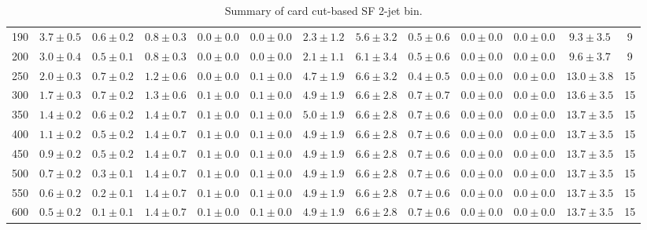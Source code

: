 \begin{table}
{\begin{center}
\begin{tabular}{l | c c | c c c c c c c c  | c c}
190 & $3.7\pm0.5$ & $0.6\pm0.2$ & $0.8\pm0.3$ & $0.0\pm0.0$ & $0.0\pm0.0$ & $2.3\pm1.2$ & $5.6\pm3.2$ & $0.5\pm0.6$ & $0.0\pm0.0$ & $0.0\pm0.0$ & $9.3\pm3.5$ & 9 \\
200 & $3.0\pm0.4$ & $0.5\pm0.1$ & $0.8\pm0.3$ & $0.0\pm0.0$ & $0.0\pm0.0$ & $2.1\pm1.1$ & $6.1\pm3.4$ & $0.5\pm0.6$ & $0.0\pm0.0$ & $0.0\pm0.0$ & $9.6\pm3.7$ & 9 \\
250 & $2.0\pm0.3$ & $0.7\pm0.2$ & $1.2\pm0.6$ & $0.0\pm0.0$ & $0.1\pm0.0$ & $4.7\pm1.9$ & $6.6\pm3.2$ & $0.4\pm0.5$ & $0.0\pm0.0$ & $0.0\pm0.0$ & $13.0\pm3.8$ & 15 \\
300 & $1.7\pm0.3$ & $0.7\pm0.2$ & $1.3\pm0.6$ & $0.1\pm0.0$ & $0.1\pm0.0$ & $4.9\pm1.9$ & $6.6\pm2.8$ & $0.7\pm0.7$ & $0.0\pm0.0$ & $0.0\pm0.0$ & $13.6\pm3.5$ & 15 \\
350 & $1.4\pm0.2$ & $0.6\pm0.2$ & $1.4\pm0.7$ & $0.1\pm0.0$ & $0.1\pm0.0$ & $5.0\pm1.9$ & $6.6\pm2.8$ & $0.7\pm0.6$ & $0.0\pm0.0$ & $0.0\pm0.0$ & $13.7\pm3.5$ & 15 \\
400 & $1.1\pm0.2$ & $0.5\pm0.2$ & $1.4\pm0.7$ & $0.1\pm0.0$ & $0.1\pm0.0$ & $4.9\pm1.9$ & $6.6\pm2.8$ & $0.7\pm0.6$ & $0.0\pm0.0$ & $0.0\pm0.0$ & $13.7\pm3.5$ & 15 \\
450 & $0.9\pm0.2$ & $0.5\pm0.2$ & $1.4\pm0.7$ & $0.1\pm0.0$ & $0.1\pm0.0$ & $4.9\pm1.9$ & $6.6\pm2.8$ & $0.7\pm0.6$ & $0.0\pm0.0$ & $0.0\pm0.0$ & $13.7\pm3.5$ & 15 \\
500 & $0.7\pm0.2$ & $0.3\pm0.1$ & $1.4\pm0.7$ & $0.1\pm0.0$ & $0.1\pm0.0$ & $4.9\pm1.9$ & $6.6\pm2.8$ & $0.7\pm0.6$ & $0.0\pm0.0$ & $0.0\pm0.0$ & $13.7\pm3.5$ & 15 \\
550 & $0.6\pm0.2$ & $0.2\pm0.1$ & $1.4\pm0.7$ & $0.1\pm0.0$ & $0.1\pm0.0$ & $4.9\pm1.9$ & $6.6\pm2.8$ & $0.7\pm0.6$ & $0.0\pm0.0$ & $0.0\pm0.0$ & $13.7\pm3.5$ & 15 \\
600 & $0.5\pm0.2$ & $0.1\pm0.1$ & $1.4\pm0.7$ & $0.1\pm0.0$ & $0.1\pm0.0$ & $4.9\pm1.9$ & $6.6\pm2.8$ & $0.7\pm0.6$ & $0.0\pm0.0$ & $0.0\pm0.0$ & $13.7\pm3.5$ & 15 \\
 \hline
 \hline
\end{tabular}
\end{center}
}
\caption{Summary of card cut-based SF 2-jet bin.}
\end{table}
